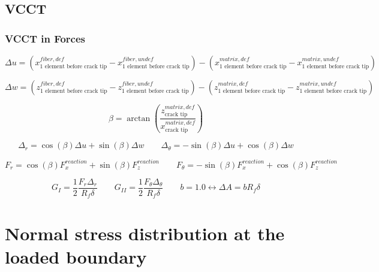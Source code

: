 \documentclass[first,firstsupp,lastsupp,handout,last,hyperref,table]{ETHclass}
\begin{document}
\subsection{VCCT}
\begin{frame}
\frametitle{\small VCCT  in Forces}
\vspace{-0.5cm}
\tiny
\centering
\captionsetup[figure]{font=scriptsize,labelfont=scriptsize}
\begin{equation}
\Delta u = \left(x^{fiber, def}_{\text{1 element before crack tip}}-x^{fiber, undef}_{\text{1 element before crack tip}}\right)-\left(x^{matrix, def}_{\text{1 element before crack tip}}-x^{matrix, undef}_{\text{1 element before crack tip}}\right)
\end{equation}

\begin{equation}
\Delta w = \left(z^{fiber, def}_{\text{1 element before crack tip}}-z^{fiber, undef}_{\text{1 element before crack tip}}\right)-\left(z^{matrix, def}_{\text{1 element before crack tip}}-z^{matrix, undef}_{\text{1 element before crack tip}}\right)
\end{equation}

\begin{equation}
\beta=\arctan{\left(\frac{z^{matrix, def}_{\text{crack tip}}}{x^{matrix, def}_{\text{crack tip}}}\right)}
\end{equation}

\begin{equation}
\Delta_{r}=\cos{\left(\beta\right)}\Delta u+\sin{\left(\beta\right)}\Delta w\qquad\Delta_{\theta}=-\sin{\left(\beta\right)}\Delta u+\cos{\left(\beta\right)}\Delta w
\end{equation}

\begin{equation}
F_{r}=\cos{\left(\beta\right)}F^{reaction}_{x}+\sin{\left(\beta\right)}F^{reaction}_{z}\qquad F_{\theta}=-\sin{\left(\beta\right)}F^{reaction}_{x}+\cos{\left(\beta\right)}F^{reaction}_{z}
\end{equation}

\begin{equation}
G_{I}=\frac{1}{2}\frac{F_{r}\Delta_{r}}{R_{f}\delta}\qquad G_{II}=\frac{1}{2}\frac{F_{\theta}\Delta_{\theta}}{R_{f}\delta}\qquad b=1.0\leftrightarrow\Delta A = bR_{f}\delta
\end{equation}
\end{frame}

\section[$\sigma_{xx}\left(x=L,z\right)$]{Normal stress distribution at the loaded boundary}
\end{document}
